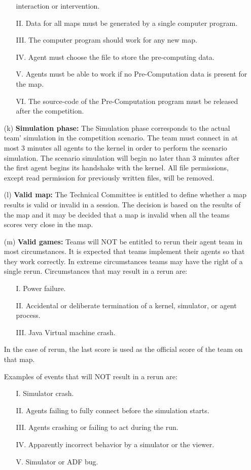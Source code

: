 \documentclass{article}
\begin{document}
\begin{itemize}
\begin{itemize}
interaction or intervention.
\item[II.] Data for all maps must be generated by a single computer program.
\item[III.] The computer program should work for any new map.
\item[IV.] Agent must choose the file to store the pre-computing data.
\item[V.] Agents must be able to work if no Pre-Computation data is present for 
the map.
\item[VI.] The source-code of the Pre-Computation program must be released 
after the competition.
\end{itemize}
\item[(k)] \textbf{Simulation phase:} The Simulation phase corresponds to the 
actual team' simulation in the competition scenario. The team must connect in 
at most 3 minutes all agents to the kernel in order to perform the scenario 
simulation. The scenario simulation will begin no later than 3 minutes after 
the first agent begins its handshake with the kernel. All file permissions, 
except read permission for previously written files, will be removed.
\item[(l)] \textbf{Valid map:} The Technical Committee is entitled to define 
whether a map results is valid or invalid in a session. The decision is based 
on the results of the map and it may be decided that a map is invalid when all 
the teams scores very close in the map.
\item[(m)] \textbf{Valid games:} Teams will NOT be entitled to rerun their 
agent team in most circumstances. It is expected that teams implement their 
agents so that they work correctly. In extreme circumstances teams may have the 
right of a single rerun. Circumstances that may result in a rerun are:
\begin{itemize}
\item[I.] Power failure.
\item[II.] Accidental or deliberate termination of a kernel, simulator, or agent
process.
\item[III.] Java Virtual machine crash.
\end{itemize}
In the case of rerun, the last score is used as the official score of the team 
on that map.

Examples of events that will NOT result in a rerun are:
\begin{itemize}
\item[I.] Simulator crash.
\item[II.] Agents failing to fully connect before the simulation starts.
\item[III.] Agents crashing or failing to act during the run.
\item[IV.] Apparently incorrect behavior by a simulator or the viewer.
\item[V.] Simulator or ADF bug.
\end{itemize}


\end{itemize}
\end{document}

